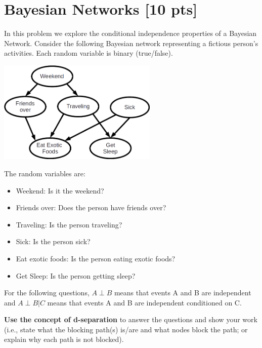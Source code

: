 \documentclass[submit]{harvardml}
\newcommand{\attr}[1]{\textsf{#1}}
\begin{document}
\newpage

\section*{Bayesian Networks [10 pts]}
\begin{problem}

  \noindent In this problem we explore the conditional independence
  properties of a Bayesian Network.  Consider the following Bayesian
  network representing a fictious person's activities. Each random
  variable is binary (true/false).

\begin{center}
\includegraphics[width=3in]{bn.png}
\end{center}

The random variables are:

\begin{itemize}
\item \attr{Weekend}: Is it the weekend?
\item \attr{Friends over}: Does the person have friends over?
\item \attr{Traveling}: Is the person traveling?
\item \attr{Sick}: Is the person sick?
\item \attr{Eat exotic foods}: Is the person eating exotic foods?
\item \attr{Get Sleep}: Is the person getting sleep?
\end{itemize}

\medskip

For the following questions, $A \perp B$ means that events A and B are
independent and $A \perp B | C$ means that events A and B are independent
conditioned on C.

\textbf{Use the concept of d-separation} to answer the
questions and show your work (i.e., state what the blocking path(s) is/are and what nodes block the path; or explain why each path is not blocked).



\end{problem}
\end{document}

